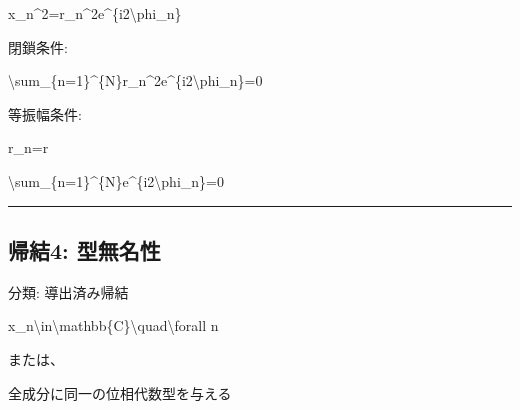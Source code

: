 \documentclass[
  a4paper]{ltjsarticle}
\newenvironment{Shaded}{}{}
\newcommand{\NormalTok}[1]{#1}
\begin{document}
\begin{Shaded}
\begin{Highlighting}[]
\NormalTok{x\_n\^{}2=r\_n\^{}2e\^{}\{i2\textbackslash{}phi\_n\}}
\end{Highlighting}
\end{Shaded}

閉鎖条件:

\begin{Shaded}
\begin{Highlighting}[]
\NormalTok{\textbackslash{}sum\_\{n=1\}\^{}\{N\}r\_n\^{}2e\^{}\{i2\textbackslash{}phi\_n\}=0}
\end{Highlighting}
\end{Shaded}

等振幅条件:

\begin{Shaded}
\begin{Highlighting}[]
\NormalTok{r\_n=r}
\end{Highlighting}
\end{Shaded}

\begin{Shaded}
\begin{Highlighting}[]
\NormalTok{\textbackslash{}sum\_\{n=1\}\^{}\{N\}e\^{}\{i2\textbackslash{}phi\_n\}=0}
\end{Highlighting}
\end{Shaded}

\begin{center}\rule{0.5\linewidth}{0.5pt}\end{center}

\subsection{帰結4:
型無名性}\label{ux5e30ux7d504-ux578bux7121ux540dux6027}

分類: 導出済み帰結

\begin{Shaded}
\begin{Highlighting}[]
\NormalTok{x\_n\textbackslash{}in\textbackslash{}mathbb\{C\}\textbackslash{}quad\textbackslash{}forall n}
\end{Highlighting}
\end{Shaded}

または、

\begin{Shaded}
\begin{Highlighting}[]
\NormalTok{全成分に同一の位相代数型を与える}
\end{Highlighting}
\end{Shaded}
\end{document}
